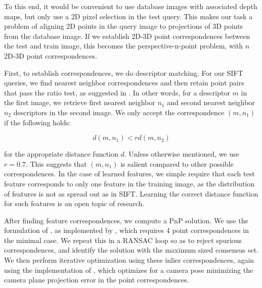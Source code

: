 To this end, it would be convenient to use database images with associated depth maps, but only use a 2D pixel selection in the test query. This makes our task a problem of aligning 2D points in the query image to projections of 3D points from the database image. If we establish 2D-3D point correspondences between the test and train image, this becomes the perspective-n-point problem, with $n$ 2D-3D point correspondences.

First, to establish correspondences, we do descriptor matching. For our SIFT queries, we find nearest neighbor correspondences and then retain point pairs that pass the ratio test, as suggested in \cite{lowe1999object}. In other words, for a descriptor $m$ in the first image, we retrieve first nearest neighbor $n_1$ and second nearest neighbor $n_2$ descriptors in the second image. We only accept the correspondence $(m, n_1)$ if the following holds:

\begin{equation}
d(m, n_1) < r d(m, n_2)
\end{equation}

for the appropriate distance function $d$. Unless otherwise mentioned, we use $r=0.7$. This suggests that $(m, n_1)$ is salient compared to other possible correspondences. In the case of learned features, we simple require that each test feature corresponds to only one feature in the training image, as the distribution of features is not as spread out as in SIFT. Learning the correct distance function for such features is an open topic of research.

After finding feature correspondences, we compute a PnP solution. We use the formulation of \cite{lepetit2009epnp}, as implemented by \cite{opencv_library}, which requires 4 point correspondences in the minimal case. We repeat this in a RANSAC loop so as to reject spurious correspondences, and identify the solution with the maximum sized consensus set. We then perform iterative optimization using these inlier correspondences, again using the implementation of \cite{opencv_library}, which optimizes for a camera pose minimizing the camera plane projection error in the point correspondences.

\cleardoublepage
